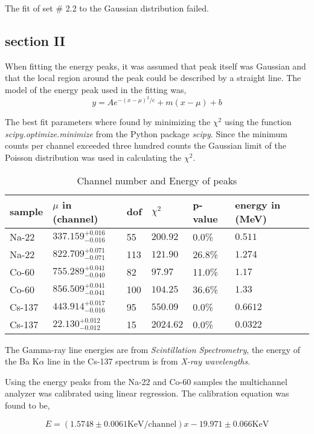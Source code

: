 \documentclass[%
 reprint,
 amsmath,amssymb,
 aps,
]{revtex4-1}
\begin{document}
The fit of set \# 2.2 to the Gaussian distribution failed.

\subsection{section II}
When fitting the energy peaks, it was assumed that peak itself was Gaussian and that the local region around the peak could be described by a straight line. The model of the energy peak used in the fitting was,
\[
y = A e^{-(x - \mu)^2/c} + m (x - \mu) + b
\]

The best fit parameters where found by minimizing the $\chi^2$ using the function \textit{scipy.optimize.minimize} from the Python package \textit{scipy}. Since the minimum counts per channel exceeded three hundred counts the Gaussian limit of the Poisson distribution was used in calculating the $\chi^2$.

\begin{table}[!htbp]
\centering
\caption{Channel number and Energy of peaks}
\begin{tabular}{|l|l|l|l|l|l|}
\hline
sample & $\mu$ in (channel) & dof & $\chi^2$ & p-value & energy in (MeV) \\ \hline
Na-22 & $337.159_{-0.016}^{+0.016}$ & 55 & $200.92$ & 0.0\% & $0.511$ \\ \hline
Na-22 & $822.709_{-0.071}^{+0.071}$ & 113 & $121.90$ & 26.8\% & $1.274$ \\ \hline
Co-60 & $755.289_{-0.040}^{+0.041}$ & 82 & $97.97$ & 11.0\% & $1.17$ \\ \hline
Co-60 & $856.509_{-0.041}^{+0.041}$ & 100 & $104.25$ & 36.6\% & $1.33$ \\ \hline
Cs-137 & $443.914_{-0.016}^{+0.017}$ & 95 & $550.09$ & 0.0\% & $0.6612$ \\ \hline
Cs-137 & $22.130_{-0.012}^{+0.012}$ & 15 & $2024.62$ & 0.0\% & $0.0322$ \\ \hline
\end{tabular}
\end{table}

The Gamma-ray line energies are from \textit{Scintillation Spectrometry}\cite{scintillation}, the energy of the Ba $\text{K}\alpha$ line in the Cs-137 spectrum is from \textit{X-ray wavelengths}\cite{xray}.

Using the energy peaks from the Na-22 and Co-60 samples the multichannel analyzer was calibrated using linear regression. The calibration equation was found to be,

\[
E = \left(1.5748 \pm 0.0061 \text{KeV}/\text{channel}\right)x - 19.971 \pm 0.066 \text{KeV}
\]
\end{document}
